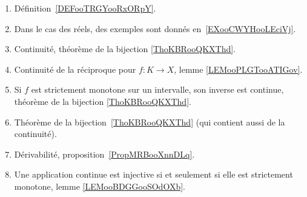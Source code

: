		\label{THEMEooOXNQooERGEGL}
\begin{enumerate}
	\item
	      Définition~\ref{DEFooTRGYooRxORpY}.
	\item
	      Dans le cas des réels, des exemples sont donnés en~\ref{EXooCWYHooLEciVj}.
	\item
	      Continuité, théorème de la bijection \ref{ThoKBRooQKXThd}.
	\item
	      Continuité de la réciproque pour \( f\colon K\to X\), lemme \ref{LEMooPLGTooATIGov}.
	\item
	      Si \( f\) est strictement monotone sur un intervalle, son inverse est continue, théorème de la bijection \ref{ThoKBRooQKXThd}.
	\item
	      Théorème de la bijection~\ref{ThoKBRooQKXThd} (qui contient aussi de la continuité).
	\item
	      Dérivabilité, proposition~\ref{PropMRBooXnnDLq}.
	\item
	      Une application continue est injective si et seulement si elle est strictement monotone, lemme \ref{LEMooBDGGooSOdOXb}.
\end{enumerate}
